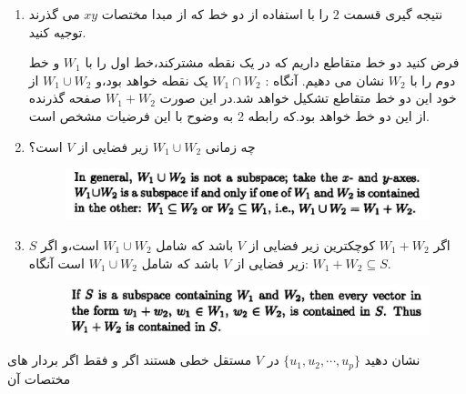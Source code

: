 \documentclass{article}
\begin{document}
\begin{enumerate}
\begin{حل}
		{\bf  مولد بودن:}
		باید ثابت کنیم هر 
		$w\in W_1+W_2$
		را می توان به صورت ترکیب خطی 
		$B$
		نوشت.
		
		می دانیم طبق تعریف :
		$$\exists w'_1\in W_1,w'_2\in W_2\quad w=w'_1+w'_2$$
		$$\longrightarrow w'_1=\alpha_1u_1+\alpha_2u_2+\cdots+\alpha_tu_t+\alpha_{t+1}v_1+\alpha_{t+2}v_2+\cdots+\alpha_{n}v_{n-t}$$
		$$\longrightarrow w'_2=\beta_1u_1+\beta_2u_2+\cdots+\beta_tu_t+\beta_{t+1}w_1+\beta_{t+2}w_2+\cdots+\beta_{m}w_{m-t}$$
		\begin{align*}\longrightarrow w=w'_1+w'_2=&(\alpha_1+\beta_1)u_1+(\alpha_2+\beta_2)u_2+\cdots+(\alpha_t+\beta_t)u_t+\\&\alpha_{t+1}v_1+\alpha_{t+2}v_2+\cdots+\alpha_{n}v_{n-t}+\beta_{t+1}w_1+\beta_{t+2}w_2+\cdots+\beta_{m}w_{m-t}
		\end{align*}
		پس توانستیم 
		$w$
		را برحسب 
		$B$
		بنویسیم و در نتیجه 
		$B$
		مولد و مستقل خطی است و پایه است و حکم ثابت می شود.
	\end{حل}
	\item 
	نتیجه گیری قسمت 
	$2$
	را با استفاده از دو خط که از مبدا مختصات 
	$xy$
	می گذرند توجیه کنید.
	\begin{حل}
		فرض کنید دو خط متقاطع داریم که در یک نقطه مشترکند،خط اول را با 
		$W_1$
		و خط دوم را با 
		$W_2$
		نشان می دهیم.
		آنگاه :
		$W_1\cap W_2$
		یک نقطه خواهد بود،و 
		$W_1\cup W_2$
		از خود این دو خط متقاطع تشکیل خواهد شد.در این صورت 
		$W_1+W_2$
		صفحه گذرنده از این دو خط خواهد بود.که رابطه 2 به وضوح با این فرضیات مشخص است.
	\end{حل}
	\item 
	چه زمانی 
	$W_1\cup W_2$
	زیر فضایی از 
	$V$
	است؟
	\begin{حل}
			\begin{figure}[h]
			\centering
			
			‎\includegraphics[scale=0.5]{abc1}‎
		\end{figure}    
		\end{حل}
	\item 
	اگر 
	$W_1+W_2$
	کوچکترین زیر فضایی از 
	$V$
	باشد که شامل 
	$W_1\cup W_2$
	است،و اگر 
	$S$
	زیر فضایی از 
	$V$
	باشد که شامل 
	$W_1\cup W_2$
	است آنگاه:
	$W_1+W_2\subseteq S$.
	\begin{حل}
			\begin{figure}[ht]
			\centering
			
			‎\includegraphics[scale=0.5]{abc2}‎
		\end{figure}    
		\end{حل}
	
\end{enumerate}
نشان دهید 
$\{u_1,u_2,\cdots,u_p\}$
در 
$V$
مستقل خطی هستند اگر و فقط اگر بردار های مختصات آن\\
\end{document}
